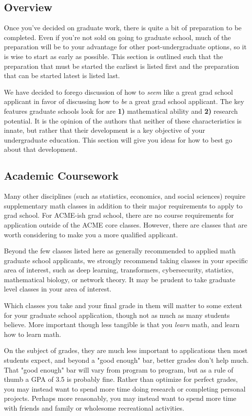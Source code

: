 \documentclass[11pt]{article}
\begin{document}
\subsection{Overview}
Once you’ve decided on graduate work, there is quite a bit of preparation to be completed. Even if you’re not sold on going to graduate school, much of the preparation will be to your advantage for other post-undergraduate options, so it is wise to start as early as possible. This section is outlined such that the preparation that must be started the earliest is listed first and the preparation that can be started latest is listed last.

We have decided to forego discussion of how to \emph{seem} like a great grad school applicant in favor of discussing how to \emph{be} a great grad school applicant. The key features graduate schools look for are \textbf{1)} mathematical ability and \textbf{2)} research potential. It is the opinion of the authors that neither of these characteristics is innate, but rather that their development is a key objective of your undergraduate education. This section will give you ideas for how to best go about that development.

\subsection{Academic Coursework}
Many other disciplines (such as statistics, economics, and social sciences) require supplementary math classes in addition to their major requirements to apply to grad school. For ACME-ish grad school, there are no course requirements for application outside of the ACME core classes. However, there are classes that are worth considering to make you a more qualified applicant.

Beyond the few classes listed here as generally recommended to applied math graduate school applicants, we strongly recommend taking classes in your specific area of interest, such as deep learning, transformers, cybersecurity, statistics, mathematical biology, or network theory. It may be prudent to take graduate level classes in your area of interest.

Which classes you take and your final grade in them will matter to some extent for your graduate school application, though not as much as many students believe. More important though less tangible is that you \emph{learn} math, and learn how to learn math. 

On the subject of grades, they are much less important to applications then most students expect, and beyond a "good enough" bar, better grades don't help much. That "good enough" bar will vary from program to program, but as a rule of thumb a GPA of 3.5 is probably fine. Rather than optimize for perfect grades, you may instead want to spend more time doing research or completing personal projects. Perhaps more reasonably, you may instead want to spend more time with friends and family or wholesome recreational activities.
\end{document}
